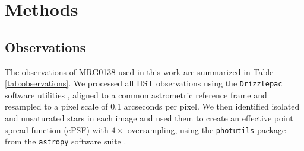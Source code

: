 \documentclass[12pt]{article}
\begin{document}




\section*{Methods}


\subsection*{Observations} %

The observations of MRG0138 used in this work are  summarized in Table \ref{tab:observations}.   We processed all HST observations using the {\tt Drizzlepac} software utilities \cite{gonzaga_drizzlepac_2012}, aligned to a common astrometric reference frame and resampled to a pixel scale of 0.1 arcseconds per pixel.  We then identified isolated and unsaturated stars in each image and used them to create an effective point spread function (ePSF) with $4\times$ oversampling, using the {\tt photutils} package from the {\tt astropy} software suite \cite{the_astropy_collaboration_astropy_2018}.   
\end{document}
